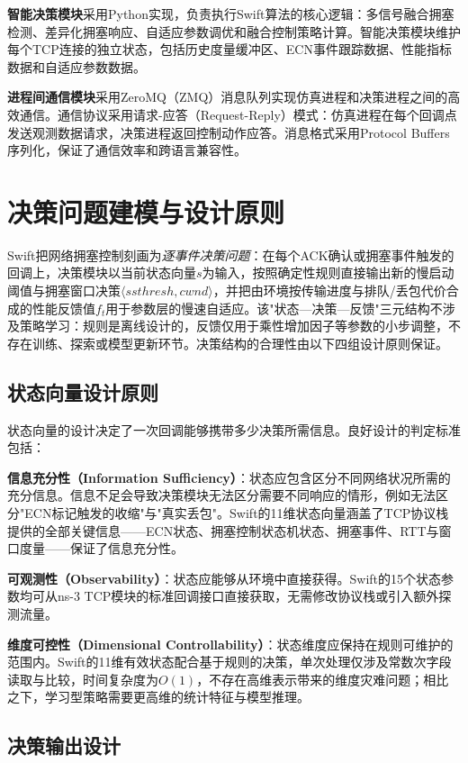 \textbf{智能决策模块}采用Python实现，负责执行Swift算法的核心逻辑：多信号融合拥塞检测、差异化拥塞响应、自适应参数调优和融合控制策略计算。智能决策模块维护每个TCP连接的独立状态，包括历史度量缓冲区、ECN事件跟踪数据、性能指标数据和自适应参数数据。

\textbf{进程间通信模块}采用ZeroMQ（ZMQ）消息队列实现仿真进程和决策进程之间的高效通信。通信协议采用请求-应答（Request-Reply）模式：仿真进程在每个回调点发送观测数据请求，决策进程返回控制动作应答。消息格式采用Protocol Buffers序列化，保证了通信效率和跨语言兼容性。

\section{决策问题建模与设计原则}

Swift把网络拥塞控制刻画为\emph{逐事件决策问题}：在每个ACK确认或拥塞事件触发的回调上，决策模块以当前状态向量$s$为输入，按照确定性规则直接输出新的慢启动阈值与拥塞窗口决策$\langle ssthresh, cwnd\rangle$，并把由环境按传输进度与排队/丢包代价合成的性能反馈值$f_t$用于参数层的慢速自适应。该"状态—决策—反馈"三元结构不涉及策略学习：规则是离线设计的，反馈仅用于乘性增加因子等参数的小步调整，不存在训练、探索或模型更新环节。决策结构的合理性由以下四组设计原则保证。

\subsection{状态向量设计原则}

状态向量的设计决定了一次回调能够携带多少决策所需信息。良好设计的判定标准包括：

\textbf{信息充分性（Information Sufficiency）}：状态应包含区分不同网络状况所需的充分信息。信息不足会导致决策模块无法区分需要不同响应的情形，例如无法区分"ECN标记触发的收缩"与"真实丢包"。Swift的11维状态向量涵盖了TCP协议栈提供的全部关键信息——ECN状态、拥塞控制状态机状态、拥塞事件、RTT与窗口度量——保证了信息充分性。

\textbf{可观测性（Observability）}：状态应能够从环境中直接获得。Swift的15个状态参数均可从ns-3 TCP模块的标准回调接口直接获取，无需修改协议栈或引入额外探测流量。

\textbf{维度可控性（Dimensional Controllability）}：状态维度应保持在规则可维护的范围内。Swift的11维有效状态配合基于规则的决策，单次处理仅涉及常数次字段读取与比较，时间复杂度为$O(1)$，不存在高维表示带来的维度灾难问题；相比之下，学习型策略需要更高维的统计特征与模型推理。

\subsection{决策输出设计}

